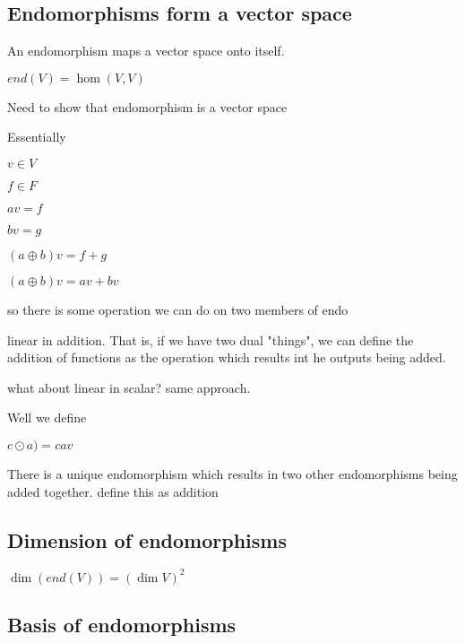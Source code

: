 
\subsection{Endomorphisms form a vector space}

An endomorphism maps a vector space onto itself.

\( end (V)=\hom (V, V)\)

Need to show that endomorphism is a vector space

Essentially

\(v\in V\)

\(f\in F\)

\(av = f\)

\(bv = g\)


\((a\oplus b)v=f+g\)

\((a\oplus b)v=av + bv\)

so there is some operation we can do on two members of endo

linear in addition. That is, if we have two dual "things", we can define the addition of functions as the operation which results int he outputs being added.

what about linear in scalar? same approach.

Well we define 

\(c\odot a)=cav\)

There is a unique endomorphism which results in two other endomorphisms being added together. define this as addition
\subsection{Dimension of endomorphisms}

\(\dim (end(V))=(\dim V )^2\)

\subsection{Basis of endomorphisms}

